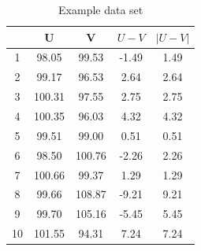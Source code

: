 \documentclass[12pt, a4paper]{report}
\theoremstyle{plain}
\theoremstyle{definition}
\theoremstyle{remark}
\begin{document}
	
	
	
	
	\begin{table}[ht]
		\centering
		\begin{tabular}{|c|c|c|c|c|}
			\hline
			& U & V & $U-V$ & $|U-V|$ \\ 
			\hline
			1 & 98.05 & 99.53 & -1.49 & 1.49 \\ 
			2 & 99.17 & 96.53 & 2.64 & 2.64 \\ 
			3 & 100.31 & 97.55 & 2.75 & 2.75 \\ 
			4 & 100.35 & 96.03 & 4.32 & 4.32 \\ 
			5 & 99.51 & 99.00 & 0.51 & 0.51 \\ 
			6 & 98.50 & 100.76 & -2.26 & 2.26 \\ 
			7 & 100.66 & 99.37 & 1.29 & 1.29 \\ 
			8 & 99.66 & 108.87 & -9.21 & 9.21 \\ 
			9 & 99.70 & 105.16 & -5.45 & 5.45 \\ 
			10 & 101.55 & 94.31 & 7.24 & 7.24 \\ 
			\hline
		\end{tabular}
		\caption{Example data set}
		\label{EADdata}
	\end{table}
	
\end{document}
